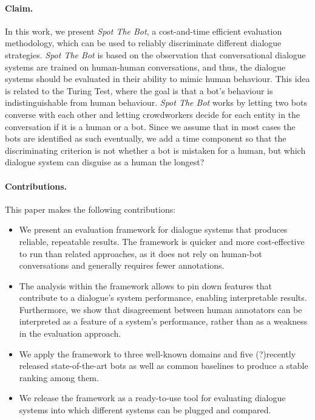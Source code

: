 \documentclass[11pt,a4paper]{article}
\begin{document}
\paragraph{Claim.}
In this work, we present \emph{Spot The Bot}, a cost-and-time efficient evaluation methodology, which can be used to reliably discriminate different dialogue strategies. \emph{Spot The Bot} is based on the observation that conversational dialogue systems are trained on human-human conversations, and thus, the dialogue systems should be evaluated in their ability to mimic human behaviour. This idea is related to the Turing Test, where the goal is that a bot's behaviour is indistinguishable from human behaviour.
\emph{Spot The Bot} works by letting two bots converse with each other and letting crowdworkers decide for each entity in the conversation if it is a human or a bot. Since we assume that in most cases the bots are identified as such eventually, we add a time component so that the discriminating criterion is not whether a bot is mistaken for a human, but which dialogue system can disguise as a human the longest?

\paragraph{Contributions.}
This paper makes the following contributions:
\begin{itemize}
\item We present an evaluation framework for dialogue systems that produces reliable, repeatable results. The framework is quicker and more cost-effective to run than related approaches, as it does not rely on human-bot conversations and generally requires fewer annotations.
\item The analysis within the framework allows to pin down features that contribute to a dialogue's system performance, enabling interpretable results. Furthermore, we show that disagreement between human annotators can be interpreted as a feature of a system's performance, rather than as a weakness in the evaluation approach. 
\item We apply the framework to three well-known domains and five (?)recently released state-of-the-art bots as well as common baselines to produce a stable ranking among them.
\item We release the framework as a ready-to-use tool for evaluating dialogue systems into which different systems can be plugged and compared.
\end{itemize}
\end{document}
